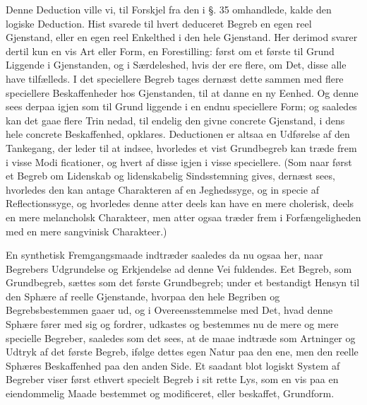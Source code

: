 \documentclass[12pt]{book}
\makeatletter
\def\textit#1{#1}%
\def\emph#1{#1}%
\newcommand{\umph}[2][misc]{%
  \@ifundefined{umph@#1@on}{#2}{\emph{#2}}}
\newcommand{\opage}[1]{\marginnote{\footnotesize\textit{[#1]}}}
\makeatother
\begin{document}
Denne Deduction ville vi, til Forskjel fra den i §. 35 omhandlede, kalde den
\emph{logiske Deduction}. Hist svarede til hvert deduceret Begreb en egen reel
Gjenstand, eller en egen reel Enkelthed i den hele Gjenstand. \emph{Her} derimod
svarer dertil kun en vis Art eller Form, en \umph[schwab]{abstract} Forestilling: først om et første
til Grund Liggende i Gjenstanden, og i Særdeleshed, hvis der ere flere, om Det, disse
alle have tilfælleds. I det speciellere Begreb tages dernæst dette sammen med flere
speciellere Beskaffenheder hos Gjenstanden, til at danne en ny Eenhed. Og denne sees
derpaa igjen som til Grund liggende i en endnu speciellere Form; og saaledes kan det
gaae flere Trin nedad, til endelig den givne \emph{concrete} Gjenstand, i dens hele
\emph{concrete} Beskaffenhed, opklares. Deductionen er altsaa en Udførelse af den
Tankegang, der leder til at indsee, hvorledes et vist Grundbegreb kan træde frem i
visse Modi%
\opage{141}ficationer, og hvert af disse igjen i visse speciellere. (Som naar først et Begreb om
Lidenskab og lidenskabelig Sindsstemning gives, dernæst sees, hvorledes den kan
antage Charakteren af en Jeghedssyge, og \textit{in specie} af Reflectionssyge, og
hvorledes denne atter deels kan have en mere cholerisk, deels en mere melancholsk
Charakteer, men atter ogsaa træder frem i Forfængeligheden med en mere sangvinisk
Charakteer.)

\emph{En synthetisk Fremgangsmaade} indtræder saaledes da nu ogsaa her, naar
Begrebers Udgrundelse og Erkjendelse ad denne Vei fuldendes. Eet Begreb, som
Grundbegreb, sættes som det første Grundbegreb; under et bestandigt Hensyn til den
Sphære af reelle Gjenstande, hvorpaa den hele Begriben og Begrebsbestemmen gaaer ud,
og i Overeensstemmelse med Det, hvad denne Sphære fører med sig og fordrer, udkastes
og bestemmes nu de mere og mere specielle Begreber, saaledes som det sees, at de maae
indtræde som Artninger og Udtryk af det første Begreb, ifølge dettes egen Natur paa
den ene, men den reelle Sphæres Beskaffenhed paa den anden Side. Et saadant
\emph{blot logiskt System} af Begreber viser først ethvert specielt Begreb i sit rette
Lys, som en vis paa en eiendommelig Maade bestemmet og modificeret, eller beskaffet,
Grundform.
\end{document}
